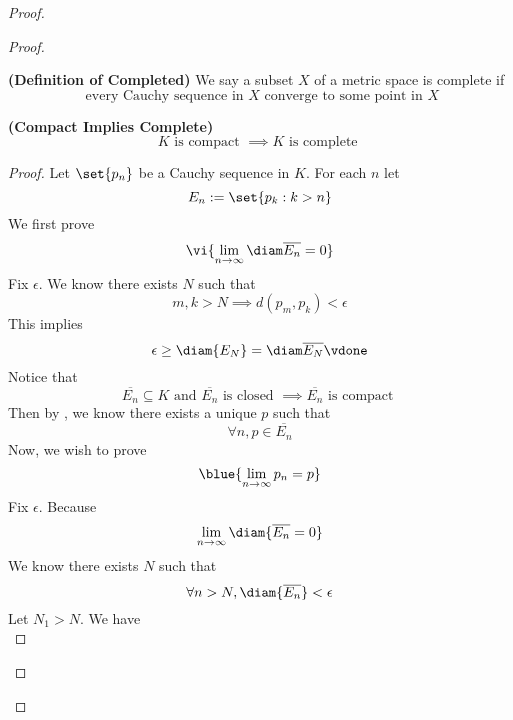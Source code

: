 \documentclass{report}
\begin{document}
\begin{proof}
\begin{proof}
\begin{definition}
\label{3.10.7}
\textbf{(Definition of Completed)} We say a subset $X$ of a metric space is complete if 
\begin{equation*}
\text{ every Cauchy sequence in $X$ converge to some point in $X$}
\end{equation*}
\end{definition}
\begin{theorem}
\label{3.10.8}
\textbf{(Compact Implies Complete)} 
\begin{equation*}
K\text{ is compact }\implies K\text{ is complete }
\end{equation*}
\end{theorem}
\begin{proof}
Let $\set{p_n}$ be a Cauchy sequence in $K$. For each $n$ let
 \begin{equation*}
E_n:=\set{p_k:k> n}
\end{equation*}
We first prove 
\begin{equation*}
  \vi{\lim_{n\to\infty}\diam \overline{E_n}=0}
\end{equation*}
Fix $\epsilon $. We know there exists $N$ such that
 \begin{equation*}
m,k>N\implies d(p_m,p_k)<\epsilon 
\end{equation*}
This implies
\begin{equation*}
\epsilon \geq \diam{E_N}=\diam \overline{E_N}\vdone
\end{equation*}
Notice that
\begin{equation*}
\overline{E_n}\subseteq K\text{ and }\overline{E_n}\text{ is closed }\implies \overline{E_n}\text{ is compact }
\end{equation*}
Then by , we know there exists a unique $p$ such that
 \begin{equation*}
\forall n, p\in  \overline{E_n}
\end{equation*}
Now, we wish to prove
\begin{equation*}
  \blue{\lim_{n\to\infty}p_n=p}
\end{equation*}
Fix $\epsilon $. Because
\begin{equation*} \lim_{n\to\infty}\diam{\overline{E_n}=0}
\end{equation*}
We know there exists $N$ such that
 \begin{equation*}
\forall n>N, \diam{\overline{E_n}}<\epsilon 
\end{equation*}
Let $N_1>N$. We have
 \begin{equation*}

\end{equation*}
\end{proof}
\end{proof}
\end{proof}
\end{document}
